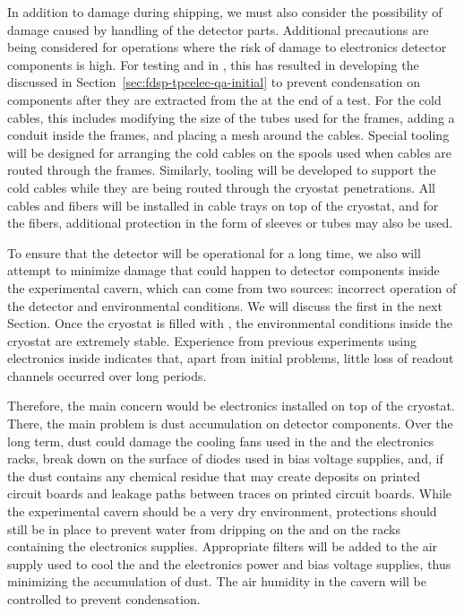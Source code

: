 In addition to damage during shipping, we must also consider the
possibility of damage caused by handling of the detector parts.
Additional precautions are being considered for operations where
the risk of damage to  electronics detector components is
high. For testing  and  
in \lntwo, this has resulted in developing the
 discussed in Section~\ref{sec:fdsp-tpcelec-qa-initial}
to prevent condensation on components after they are extracted from
the \lntwo at the end of a test. For the cold cables, this 
includes modifying the size of the tubes used for the  frames,
adding a conduit inside the frames, and placing a mesh around 
the cables. Special tooling will be designed for arranging the
cold cables on the spools used when cables are routed through
the  frames. Similarly, tooling will be developed to 
support the cold cables while they are being routed through the 
cryostat penetrations. All cables and fibers will
be installed in cable trays on top of the cryostat, and for the fibers, additional protection in the form of sleeves or tubes 
may also be used. 

To ensure that the  detector will be operational for a long
time, we also will attempt to minimize 
damage that could happen to detector components inside the 
experimental cavern, which can come from two sources: incorrect
operation of the detector and environmental conditions. We
will discuss the first in the next Section. Once the cryostat is filled with , the environmental
conditions inside the cryostat are extremely stable. Experience from 
previous experiments using electronics inside 
 indicates that, apart from initial problems, little loss of readout channels occurred over long periods. 

Therefore, the main concern would be electronics 
installed on top of the cryostat. There, the main problem
is dust accumulation on detector components. Over the long
term, dust could damage the cooling fans used
in the  and the  electronics racks, break down 
on the surface of diodes used in bias voltage supplies,
and, if the dust contains any chemical residue that may
create deposits on printed circuit boards and leakage paths
between traces on printed circuit boards. While the
experimental cavern should be a very dry environment,
protections should still be in place to prevent water from 
dripping on the  and on the racks containing the
 electronics supplies. Appropriate filters will be added to the
air supply used to cool the  and the  electronics power and bias voltage supplies, thus minimizing
the accumulation of dust. The air humidity in the cavern 
will be controlled to prevent condensation.

